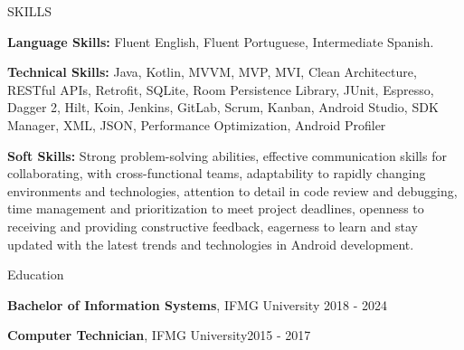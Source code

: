 \documentclass{template/faangpath}
\begin{document}
\newpage
\begin{rSection}{SKILLS}

{\bf Language Skills:} Fluent English, Fluent Portuguese, Intermediate Spanish.

{\bf Technical Skills:} Java, Kotlin, MVVM, MVP, MVI, Clean Architecture, RESTful APIs, Retrofit, 
SQLite, Room Persistence Library, JUnit, Espresso, Dagger 2, Hilt, Koin, Jenkins, GitLab,
Scrum, Kanban, Android Studio, SDK Manager, XML, JSON, Performance Optimization, Android Profiler

{\bf Soft Skills:} Strong problem-solving abilities, effective communication skills for collaborating, 
with cross-functional teams, adaptability to rapidly changing environments and technologies,
attention to detail in code review and debugging, time management and prioritization to meet project 
deadlines, openness to receiving and providing constructive feedback, eagerness to learn and stay 
updated with the latest trends and technologies in Android development.



\end{rSection}



\begin{rSection}{Education}

{\bf Bachelor of Information Systems}, IFMG University \hfill {2018 - 2024}

{\bf Computer Technician}, IFMG University\hfill {2015 - 2017}

\end{rSection}
\end{document}
